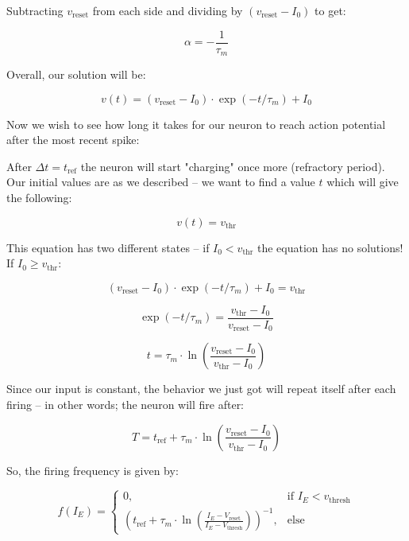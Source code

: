 Subtracting \( v_{\text{reset}} \) from each side and dividing by \( (v_{\text{reset}} - I_0) \) to get:

\begin{equation}
\alpha = -\frac{1}{\tau_m}
\end{equation}

Overall, our solution will be:

\begin{equation}
v(t) = (v_{\text{reset}} - I_0) \cdot \exp(-t/\tau_m) + I_0
\end{equation}

Now we wish to see how long it takes for our neuron to reach action potential after the most recent spike:

After \( \Delta t = t_{\text{ref}} \) the neuron will start "charging" once more (refractory period). Our initial values are as we described – we want to find a value \( t \) which will give the following:

\begin{equation}
v(t) = v_{\text{thr}}
\end{equation}

This equation has two different states – if \( I_0 < v_{\text{thr}} \) the equation has no solutions! If \( I_0 \geq v_{\text{thr}} \):

\begin{equation}
(v_{\text{reset}} - I_0) \cdot \exp(-t/\tau_m) + I_0 = v_{\text{thr}}
\end{equation}

\begin{equation}
\exp(-t/\tau_m) = \frac{v_{\text{thr}} - I_0}{v_{\text{reset}} - I_0}
\end{equation}

\begin{equation}
t = \tau_m \cdot \ln\left(\frac{v_{\text{reset}} - I_0}{v_{\text{thr}} - I_0}\right)
\end{equation}

Since our input is constant, the behavior we just got will repeat itself after each firing – in other words; the neuron will fire after:

\begin{equation}
T = t_{\text{ref}} + \tau_m \cdot \ln\left(\frac{v_{\text{reset}} - I_0}{v_{\text{thr}} - I_0}\right)
\end{equation}

So, the firing frequency is given by:

\begin{equation}
f(I_E) = \begin{cases}
    0, & \text{if } I_E < v_{\text{thresh}} \\
    \left(t_{\text{ref}} + \tau_m \cdot \ln\left(\frac{I_E - V_{\text{reset}}}{I_E - V_{\text{thresh}}}\right)\right)^{-1}, & \text{else}
\end{cases}
\end{equation}


